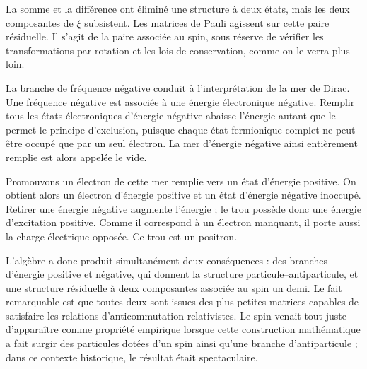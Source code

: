 La somme et la différence ont éliminé une structure à deux états, mais les deux composantes de \(\xi\) subsistent. Les matrices de Pauli agissent sur cette paire résiduelle. Il s’agit de la paire associée au spin, sous réserve de vérifier les transformations par rotation et les lois de conservation, comme on le verra plus loin.

\begin{classroomqa}
\end{classroomqa}

La branche de fréquence négative conduit à l’interprétation de la mer de Dirac. Une fréquence négative est associée à une énergie électronique négative. Remplir tous les états électroniques d’énergie négative abaisse l’énergie autant que le permet le principe d’exclusion, puisque chaque état fermionique complet ne peut être occupé que par un seul électron. La mer d’énergie négative ainsi entièrement remplie est alors appelée le vide.

Promouvons un électron de cette mer remplie vers un état d’énergie positive. On obtient alors un électron d’énergie positive et un état d’énergie négative inoccupé. Retirer une énergie négative augmente l’énergie ; le trou possède donc une énergie d’excitation positive. Comme il correspond à un électron manquant, il porte aussi la charge électrique opposée. Ce trou est un positron.

\begin{classroomqa}
\end{classroomqa}

L’algèbre a donc produit simultanément deux conséquences : des branches d’énergie positive et négative, qui donnent la structure particule--antiparticule, et une structure résiduelle à deux composantes associée au spin un demi. Le fait remarquable est que toutes deux sont issues des plus petites matrices capables de satisfaire les relations d’anticommutation relativistes. Le spin venait tout juste d’apparaître comme propriété empirique lorsque cette construction mathématique a fait surgir des particules dotées d’un spin ainsi qu’une branche d’antiparticule ; dans ce contexte historique, le résultat était spectaculaire.

